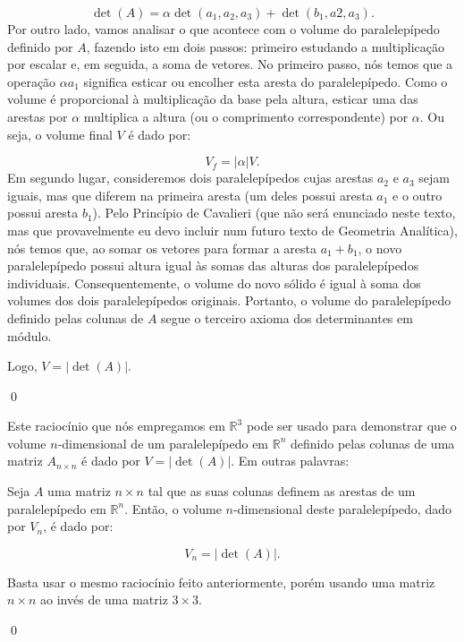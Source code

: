 \begin{Proof}
 	$$
 	\det(A) = \alpha\det(a_1, a_2, a_3) + \det(b_1, a2, a_3).
 	$$
 	Por outro lado, vamos analisar o que acontece com o volume do paralelepípedo definido por $A$, fazendo isto em dois passos: primeiro estudando a multiplicação por escalar e, em seguida, a soma de vetores. No primeiro passo, nós temos que a operação $\alpha a_1$ significa esticar ou encolher esta aresta do paralelepípedo. Como o volume é proporcional à multiplicação da base pela altura, esticar uma das arestas por $\alpha$ multiplica a altura (ou o comprimento correspondente) por $\alpha$. Ou seja, o volume final $V$ é dado por:
 	
 	$$
 	V_f = |\alpha|V.
 	$$
 	Em segundo lugar, consideremos dois paralelepípedos cujas arestas $a_2$ e $a_3$ sejam iguais, mas que diferem na primeira aresta (um deles possui aresta $a_1$ e o outro possui aresta $b_1$). Pelo Princípio de Cavalieri (que não será enunciado neste texto, mas que provavelmente eu devo incluir num futuro texto de Geometria Analítica), nós temos que, ao somar os vetores para formar a aresta $a_1 + b_1$, o novo paralelepípedo possui altura igual às somas das alturas dos paralelepípedos individuais. Consequentemente, o volume do novo sólido é igual à soma dos volumes dos dois paralelepípedos originais. Portanto, o volume do paralelepípedo definido pelas colunas de $A$ segue o terceiro axioma dos determinantes em módulo.
 	
 	Logo, $V = |\det(A)|$.
 	
 	
 	\qed 
\end{Proof}

Este raciocínio que nós empregamos em $\mathbb{R}^3$ pode ser usado para demonstrar que o volume $n$-dimensional de um paralelepípedo em $\mathbb{R}^n$ definido pelas colunas de uma matriz $A_{n\times n}$ é dado por $V = |\det(A)|$. Em outras palavras:

\begin{Theorem}
	Seja $A$ uma matriz $n\times n$ tal que as suas colunas definem as arestas de um paralelepípedo em $\mathbb{R}^n$. Então, o volume $n$-dimensional deste paralelepípedo, dado por $V_n$, é dado por:
	
	$$
	V_n = |\det(A)|.
	$$
\end{Theorem}

\begin{Proof}
	Basta usar o mesmo raciocínio feito anteriormente, porém usando uma matriz $n\times n$ ao invés de uma matriz $3\times 3$.
	
	\qed
\end{Proof}

